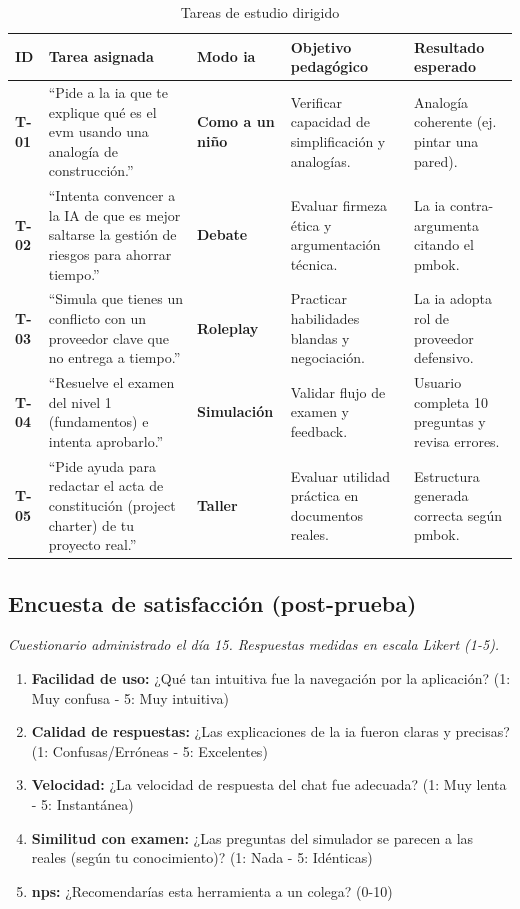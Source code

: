 \begin{table}[h]
\centering
\begin{tabularx}{0.9\textwidth}{|l|p{3.5cm}|l|X|p{3.5cm}|}
\hline
\textbf{ID} & \textbf{Tarea asignada} & \textbf{Modo \gls{ia}} & \textbf{Objetivo pedagógico} & \textbf{Resultado esperado} \\
\hline
\textbf{T-01} & \enquote{Pide a la \gls{ia} que te explique qué es el \gls{evm} usando una analogía de construcción.} & \textbf{Como a un niño} & Verificar capacidad de simplificación y analogías. & Analogía coherente (ej. pintar una pared). \\
\hline
\textbf{T-02} & \enquote{Intenta convencer a la IA de que es mejor saltarse la gestión de riesgos para ahorrar tiempo.} & \textbf{Debate} & Evaluar firmeza ética y argumentación técnica. & La \gls{ia} contra-argumenta citando el \gls{pmbok}. \\
\hline
\textbf{T-03} & \enquote{Simula que tienes un conflicto con un proveedor clave que no entrega a tiempo.} & \textbf{Roleplay} & Practicar habilidades blandas y negociación. & La \gls{ia} adopta rol de proveedor defensivo. \\
\hline
\textbf{T-04} & \enquote{Resuelve el examen del nivel 1 (fundamentos) e intenta aprobarlo.} & \textbf{Simulación} & Validar flujo de examen y feedback. & Usuario completa 10 preguntas y revisa errores. \\
\hline
\textbf{T-05} & \enquote{Pide ayuda para redactar el acta de constitución (project charter) de tu proyecto real.} & \textbf{Taller} & Evaluar utilidad práctica en documentos reales. & Estructura generada correcta según \gls{pmbok}. \\
\hline
\end{tabularx}
\caption{Tareas de estudio dirigido}
\label{tab:tareas_estudio}
\end{table}

\subsection{Encuesta de satisfacción (post-prueba)}


\textit{Cuestionario administrado el día 15. Respuestas medidas en escala Likert (1-5).}

\begin{enumerate}
\item \textbf{Facilidad de uso:} ¿Qué tan intuitiva fue la navegación por la aplicación? (1: Muy confusa - 5: Muy intuitiva)
\item \textbf{Calidad de respuestas:} ¿Las explicaciones de la \gls{ia} fueron claras y precisas? (1: Confusas/Erróneas - 5: Excelentes)
\item \textbf{Velocidad:} ¿La velocidad de respuesta del chat fue adecuada? (1: Muy lenta - 5: Instantánea)
\item \textbf{Similitud con examen:} ¿Las preguntas del simulador se parecen a las reales (según tu conocimiento)? (1: Nada - 5: Idénticas)
\item \textbf{\gls{nps}:} ¿Recomendarías esta herramienta a un colega? (0-10)

\end{enumerate}

